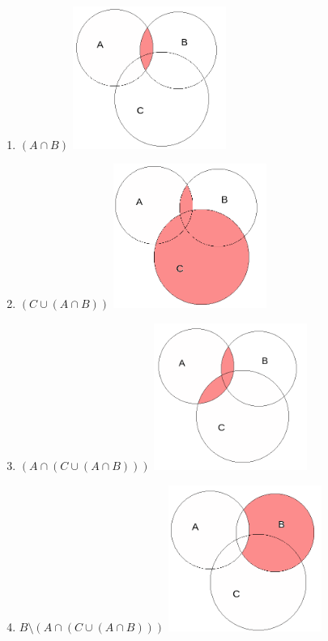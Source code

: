 \documentclass{article}
\begin{document}
\begin{enumerate}
    \item $(A \cap B)$
    \includegraphics[width=50mm]{3.png}
    
    \item $(C \cup (A \cap B))$
    \includegraphics[width=50mm]{4.png}
    
    \item $(A \cap (C \cup (A \cap B)))$
    \includegraphics[width=50mm]{5.png}
    
    \item $B \setminus (A \cap (C \cup (A \cap B)))$
    \includegraphics[width=50mm]{6.png}
\end{enumerate}
\end{document}
